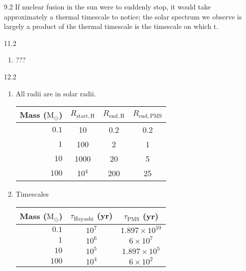 \documentclass[11pt]{article}
\newcommand\msol{\mathrm{M}_\odot}
\begin{document}
\begin{enumerate}
\item [9.2]
    If nuclear fusion in the sun were to suddenly stop, it would take approximately a thermal timescale to notice; the solar spectrum we observe is largely a product of  the thermal timescale is the timescale on which t.

\item [11.2]
	\begin{enumerate}
	
    \item ???
    
    \end{enumerate}

\item [12.2] %
	\begin{enumerate}
    
    \item All radii are in solar radii.
    	\begin{table}[H]
        \centering
        \begin{tabular}{ r | c | c | c }
          Mass ($\msol$) & $R_\mathrm{start,H}$ & $R_\mathrm{end,H}$ & $R_\mathrm{end,PMS}$ \\ \hline
          $0.1$ & 10 & 0.2 & 0.2 \\
          $1$ & 100 & 2 & 1 \\
          $10$ & 1000 & 20 & 5 \\
          $100$ & 10$^4$ & 200 & 25 \\
        \end{tabular}
        \end{table}

	\item 
        Timescales
    	\begin{table}[H]
        \centering
        \begin{tabular}{ r | c | c }
          Mass ($\msol$)  & $\tau_\mathrm{Hayashi}$ (yr) & $\tau_\mathrm{PMS}$ (yr) \\ \hline
          $0.1$ & $10^7$ & $1.897\times10^{10}$  \\
          $1$ & $10^6$ & $6\times10^{7}$  \\
          $10$ & $10^5$ & $1.897\times10^{5}$  \\
          $100$ & $10^4$ & $6\times10^{2}$ \\
        \end{tabular}
        \end{table}
    \end{enumerate}


\end{enumerate}
\end{document}
